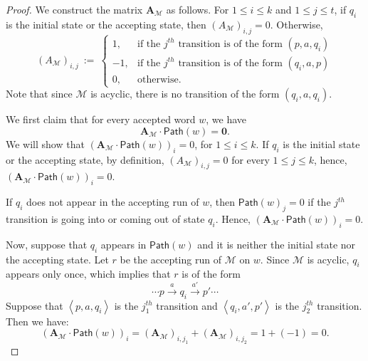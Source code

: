 \documentclass[10pt,a4paper]{article}
\theoremstyle{definition}
\theoremstyle{remark}
\newcommand{\transs}[1] {\xrightarrow{ {#1} }}
\newcommand{\cM}{\mathcal{M}}
\newcommand{\bfA}{\mathbf{A}}
\newcommand{\bfzero}{\mathbf{0}}
\newcommand{\tuple}[1]       {\left\langle #1 \right\rangle}
\newcommand{\mpath}[1] {\mathsf{Path}\left( #1 \right)}
\begin{document}
\begin{proof}
    We construct the matrix $\bfA_\cM$ as follows.
    For $1 \le i \le k$ and $1 \le j \le t$,
    if $q_i$ is the initial state or the accepting state, then
    $\left(A_\cM\right)_{i, j} = 0$.
    Otherwise,
    \begin{equation*}
        \left(A_\cM\right)_{i, j}\ :=\ 
        \begin{cases}
            1,  &\text{if the $j^{th}$ transition is of the form $(p, a, q_i)$} \\
            -1, &\text{if the $j^{th}$ transition is of the form $(q_i, a, p)$} \\
            0,  &\text{otherwise}.
        \end{cases}
    \end{equation*}
    Note that since $\cM$ is acyclic, there is no transition of the form $(q_i, a, q_i)$.

    We first claim that for every accepted word $w$, 
    we have
    \begin{equation*}
        \bfA_\cM \cdot \mpath{w} = \bfzero.    
    \end{equation*}
    We will show that $\left(\bfA_\cM \cdot \mpath{w}\right)_i = 0$,    for $1 \le i \le k$.
    If $q_i$ is the initial state or the accepting state,
    by definition, $\left(A_\cM\right)_{i, j} = 0$ for every $1 \le j \le k$,
    hence, $\left(\bfA_\cM \cdot \mpath{w}\right)_i = 0$.

    If $q_i$ does not appear in the accepting run of $w$,
    then $\mpath{w}_j=0$ if
    the $j^{th}$ transition is going into or coming out of state $q_i$.
    Hence, $\left(\bfA_\cM \cdot \mpath{w}\right)_i = 0$.

    Now, suppose that $q_i$ appears in $\mpath{w}$
    and it is 
    neither the initial state nor the accepting state.
    Let $r$ be the accepting run of $\cM$ on $w$.
    Since $\cM$ is acyclic, $q_i$ appears only once, which implies that $r$ is of the form
    \begin{equation*}
        \cdots p\transs{a} q_i \transs{a'}p'\cdots
    \end{equation*}
    Suppose that
    $\tuple{p, a, q_i}$ is the $j_1^{th}$ transition and 
    $\tuple{q_i, a', p'}$ is the $j_2^{th}$ transition.
    Then we have:
    \begin{equation*}
        \left(\bfA_\cM \cdot \mpath{w}\right)_i
        =
        \left(\bfA_\cM\right)_{i, j_1} +
        \left(\bfA_\cM\right)_{i, j_2}
        = 1 + (-1)
        = 0.
    \end{equation*}


\end{proof}
\end{document}

